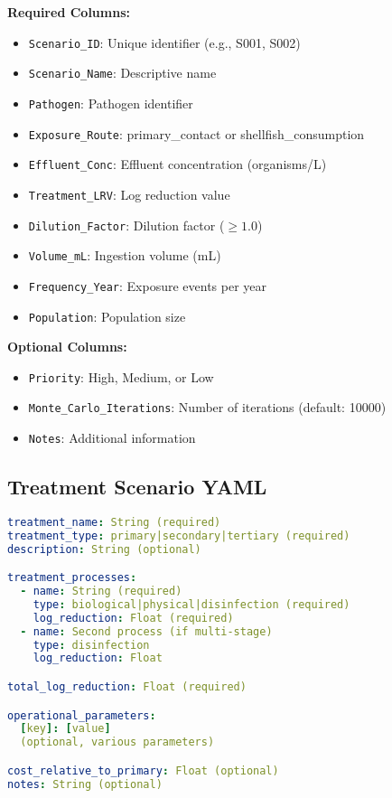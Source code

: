 \documentclass[11pt,a4paper]{article}
\begin{document}
\textbf{Required Columns:}
\begin{itemize}[leftmargin=*]
    \item \texttt{Scenario\_ID}: Unique identifier (e.g., S001, S002)
    \item \texttt{Scenario\_Name}: Descriptive name
    \item \texttt{Pathogen}: Pathogen identifier
    \item \texttt{Exposure\_Route}: primary\_contact or shellfish\_consumption
    \item \texttt{Effluent\_Conc}: Effluent concentration (organisms/L)
    \item \texttt{Treatment\_LRV}: Log reduction value
    \item \texttt{Dilution\_Factor}: Dilution factor ($\ge 1.0$)
    \item \texttt{Volume\_mL}: Ingestion volume (mL)
    \item \texttt{Frequency\_Year}: Exposure events per year
    \item \texttt{Population}: Population size
\end{itemize}

\textbf{Optional Columns:}
\begin{itemize}[leftmargin=*]
    \item \texttt{Priority}: High, Medium, or Low
    \item \texttt{Monte\_Carlo\_Iterations}: Number of iterations (default: 10000)
    \item \texttt{Notes}: Additional information
\end{itemize}

\subsection{Treatment Scenario YAML}

\begin{lstlisting}[style=bashstyle, language=yaml]
treatment_name: String (required)
treatment_type: primary|secondary|tertiary (required)
description: String (optional)

treatment_processes:
  - name: String (required)
    type: biological|physical|disinfection (required)
    log_reduction: Float (required)
  - name: Second process (if multi-stage)
    type: disinfection
    log_reduction: Float

total_log_reduction: Float (required)

operational_parameters:
  [key]: [value]
  (optional, various parameters)

cost_relative_to_primary: Float (optional)
notes: String (optional)
\end{lstlisting}
\end{document}
